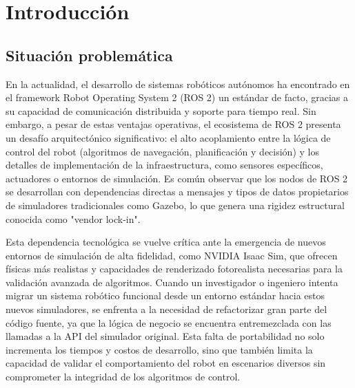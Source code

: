 \chapter{Introducción}

\section{Situación problemática}



En la actualidad, el desarrollo de sistemas robóticos autónomos ha encontrado en el framework Robot Operating System 2 (ROS 2) un estándar de facto, gracias a su capacidad de comunicación distribuida y soporte para tiempo real. Sin embargo, a pesar de estas ventajas operativas, el ecosistema de ROS 2 presenta un desafío arquitectónico significativo: el alto acoplamiento entre la lógica de control del robot (algoritmos de navegación, planificación y decisión) y los detalles de implementación de la infraestructura, como sensores específicos, actuadores o entornos de simulación. Es común observar que los nodos de ROS 2 se desarrollan con dependencias directas a mensajes y tipos de datos propietarios de simuladores tradicionales como Gazebo, lo que genera una rigidez estructural conocida como "vendor lock-in".

Esta dependencia tecnológica se vuelve crítica ante la emergencia de nuevos entornos de simulación de alta fidelidad, como NVIDIA Isaac Sim, que ofrecen físicas más realistas y capacidades de renderizado fotorealista necesarias para la validación avanzada de algoritmos. Cuando un investigador o ingeniero intenta migrar un sistema robótico funcional desde un entorno estándar hacia estos nuevos simuladores, se enfrenta a la necesidad de refactorizar gran parte del código fuente, ya que la lógica de negocio se encuentra entremezclada con las llamadas a la API del simulador original. Esta falta de portabilidad no solo incrementa los tiempos y costos de desarrollo, sino que también limita la capacidad de validar el comportamiento del robot en escenarios diversos sin comprometer la integridad de los algoritmos de control.

